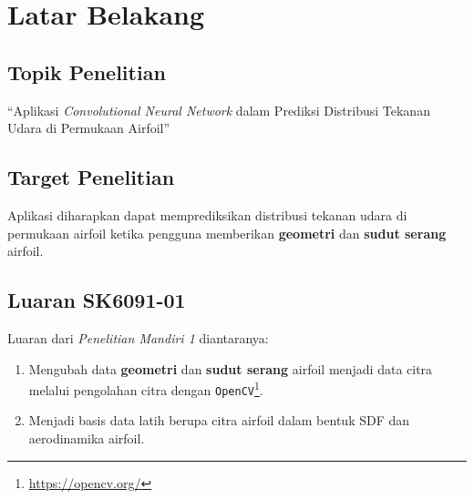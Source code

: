 \section{Latar Belakang}
\subsection{Topik Penelitian}
\begin{frame}
  \begin{center}
    \Large ``Aplikasi \textit{Convolutional Neural Network} dalam Prediksi Distribusi Tekanan Udara di Permukaan Airfoil''
  \end{center}
\end{frame}

\subsection{Target Penelitian}
\begin{frame}
  Aplikasi diharapkan dapat memprediksikan distribusi tekanan udara di permukaan airfoil ketika pengguna memberikan \textbf{geometri} dan \textbf{sudut serang} airfoil.
\end{frame}

\subsection{Luaran SK6091-01}
\begin{frame}
  Luaran dari \textit{Penelitian Mandiri 1} diantaranya:
  \begin{enumerate}
    \item Mengubah data \textbf{geometri} dan \textbf{sudut serang} airfoil menjadi data citra melalui pengolahan citra dengan \texttt{OpenCV}\footnote{\url{https://opencv.org/}}.
    \pause
    \item Menjadi basis data latih berupa citra airfoil dalam bentuk SDF \cite{oleynikova2016signed} dan aerodinamika airfoil.
  \end{enumerate}
\end{frame}
